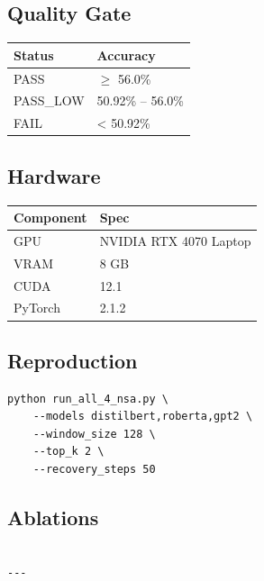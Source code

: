 \subsection{Quality Gate}

\begin{table}[H]
\centering
\small
\begin{tabular}{ll}
\toprule
\textbf{Status} & \textbf{Accuracy} \\
\midrule
PASS & $\ge$ 56.0\% \\
PASS\_LOW & 50.92\% -- 56.0\% \\
FAIL & < 50.92\% \\
\bottomrule
\end{tabular}
\end{table}

\subsection{Hardware}

\begin{table}[H]
\centering
\small
\begin{tabular}{ll}
\toprule
\textbf{Component} & \textbf{Spec} \\
\midrule
GPU & NVIDIA RTX 4070 Laptop \\
VRAM & 8 GB \\
CUDA & 12.1 \\
PyTorch & 2.1.2 \\
\bottomrule
\end{tabular}
\end{table}

\subsection{Reproduction}

\begin{lstlisting}
python run_all_4_nsa.py \
    --models distilbert,roberta,gpt2 \
    --window_size 128 \
    --top_k 2 \
    --recovery_steps 50
\end{lstlisting}

\subsection{Ablations}

\begin{lstlisting}

---
\end{lstlisting}
